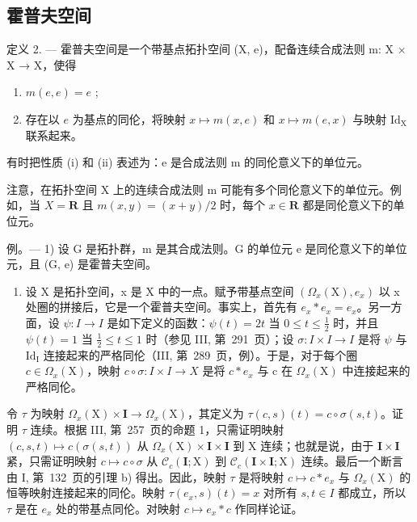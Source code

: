 \subsection{霍普夫空间}

定义 2. --- 霍普夫空间是一个带基点拓扑空间 (X, e)，配备连续合成法则 m: X × X → X，使得

\begin{enumerate}
\def\labelenumi{(\roman{enumi})}
\item
  \(m(e, e) = e\) ;
\item
  存在以 \(e\) 为基点的同伦，将映射 \(x \mapsto m(x, e)\) 和 \(x \mapsto m(e, x)\) 与映射 \(\mathrm{Id}_{\mathrm{X}}\) 联系起来。
\end{enumerate}

有时把性质 (i) 和 (ii) 表述为：e 是合成法则 m 的同伦意义下的单位元。

注意，在拓扑空间 X 上的连续合成法则 m 可能有多个同伦意义下的单位元。例如，当 \(X = \mathbf{R}\) 且 \(m(x, y) = (x + y)/2\) 时，每个 \(x \in \mathbf{R}\) 都是同伦意义下的单位元。

例。--- 1) 设 G 是拓扑群，m 是其合成法则。G 的单位元 e 是同伦意义下的单位元，且 (G, e) 是霍普夫空间。

\begin{enumerate}
\def\labelenumi{\arabic{enumi})}
\setcounter{enumi}{1}
\tightlist
\item
  设 X 是拓扑空间，x 是 X 中的一点。赋予带基点空间 \((\Omega_{x}(\mathrm{X}), e_{x})\) 以 x 处圈的拼接后，它是一个霍普夫空间。事实上，首先有 \(e_{x} * e_{x} = e_{x}\)。另一方面，设 \(\psi: I \to I\) 是如下定义的函数：\(\psi(t) = 2t\) 当 \(0 \leqslant t \leqslant \frac{1}{2}\) 时，并且 \(\psi(t) = 1\) 当 \(\frac{1}{2} \leqslant t \leqslant 1\) 时（参见 III, 第~291~页）；设 \(\sigma: I \times I \to I\) 是将 \(\psi\) 与 \(\mathrm{Id}_{\mathrm{I}}\) 连接起来的严格同伦（III, 第~289~页，例）。于是，对于每个圈 \(c \in \Omega_{x}(\mathrm{X})\)，映射 \(c \circ \sigma: I \times I \to X\) 是将 \(c * e_{x}\) 与 c 在 \(\Omega_{x}(\mathrm{X})\) 中连接起来的严格同伦。
\end{enumerate}

令 \(\tau\) 为映射 \(\Omega_x(\mathrm{X}) \times \mathbf{I} \to \Omega_x(\mathrm{X})\)，其定义为 \(\tau(c, s)(t) = c \circ \sigma(s, t)\)。证明 \(\tau\) 连续。根据 III, 第~257~页的命题 1，只需证明映射 \((c, s, t) \mapsto c(\sigma(s, t))\) 从 \(\Omega_x(\mathrm{X}) \times \mathbf{I} \times \mathbf{I}\) 到 X 连续；也就是说，由于 \(\mathbf{I} \times \mathbf{I}\) 紧，只需证明映射 \(c \mapsto c \circ \sigma\) 从 \(\mathcal{C}_c(\mathbf{I};\mathrm{X})\) 到 \(\mathcal{C}_c(\mathbf{I} \times \mathbf{I};\mathrm{X})\) 连续。最后一个断言由 I, 第~132~页的引理 b) 得出。因此，映射 \(\tau\) 是将映射 \(c \mapsto c * e_x\) 与 \(\Omega_x(\mathrm{X})\) 的恒等映射连接起来的同伦。映射 \(\tau(e_x, s)(t) = x\) 对所有 \(s, t \in I\) 都成立，所以 \(\tau\) 是在 \(e_x\) 处的带基点同伦。对映射 \(c \mapsto e_x * c\) 作同样论证。

